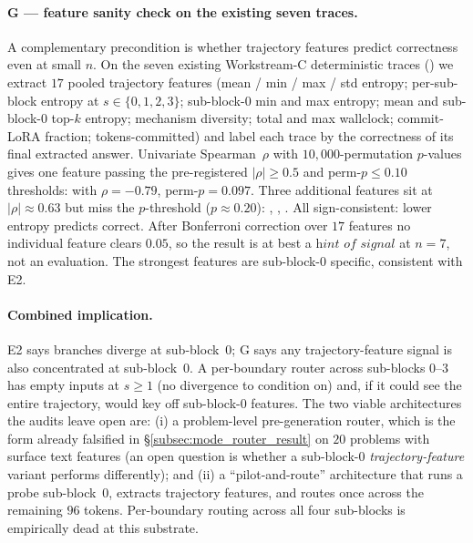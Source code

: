 \paragraph{G --- feature sanity check on the existing seven traces.}
A complementary precondition is whether trajectory features
predict correctness even at small $n$.  On the seven existing
Workstream-C deterministic traces
()
we extract $17$ pooled trajectory features (mean / min / max /
std entropy; per-sub-block entropy at $s\in\{0,1,2,3\}$;
sub-block-$0$ min and max entropy; mean and sub-block-$0$ top-$k$
entropy; mechanism diversity; total and max wallclock;
commit-LoRA fraction; tokens-committed) and label each trace by
the correctness of its final extracted answer.  Univariate
Spearman~$\rho$ with $10{,}000$-permutation $p$-values gives one
feature passing the pre-registered $|\rho| \geq 0.5$ and
perm-$p \leq 0.10$ thresholds:  with
$\rho{=}{-}0.79$, perm-$p{=}0.097$.  Three additional features
sit at $|\rho|{\approx}0.63$ but miss the $p$-threshold
($p{\approx}0.20$): ,
, .  All
sign-consistent: lower entropy predicts correct.  After
Bonferroni correction over $17$ features no individual feature
clears $0.05$, so the result is at best a $\textit{hint of
signal}$ at $n{=}7$, not an evaluation.  The strongest features
are sub-block-$0$ specific, consistent with E2.

\paragraph{Combined implication.}  E2 says branches diverge at
sub-block~$0$; G says any trajectory-feature signal is also
concentrated at sub-block~$0$.  A per-boundary router across
sub-blocks $0$--$3$ has empty inputs at $s \geq 1$ (no divergence
to condition on) and, if it could see the entire trajectory, would
key off sub-block-$0$ features.  The two viable architectures the
audits leave open are: (i) a problem-level pre-generation router,
which is the form already falsified in
\S\ref{subsec:mode_router_result} on $20$ problems with surface
text features (an open question is whether a sub-block-$0$
\emph{trajectory-feature} variant performs differently); and
(ii) a ``pilot-and-route'' architecture that runs a probe
sub-block~$0$, extracts trajectory features, and routes once
across the remaining $96$ tokens.  Per-boundary routing across
all four sub-blocks is empirically dead at this substrate.

